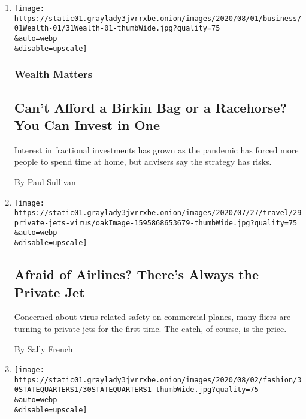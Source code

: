 \begin{enumerate}
\def\labelenumi{\arabic{enumi}.}
\item
  \href{/2020/07/31/your-money/birkin-bag-racehorse-invest.html}{}

  \texttt{[image: https://static01.graylady3jvrrxbe.onion/images/2020/08/01/business/01Wealth-01/31Wealth-01-thumbWide.jpg?quality=75\\\&auto=webp\\\&disable=upscale]}

  \hypertarget{wealth-matters}{%
  \subsubsection{Wealth Matters}\label{wealth-matters}}

  \hypertarget{cant-afford-a-birkin-bag-or-a-racehorse-you-can-invest-in-one}{%
  \subsection{Can't Afford a Birkin Bag or a Racehorse? You Can Invest
  in
  One}\label{cant-afford-a-birkin-bag-or-a-racehorse-you-can-invest-in-one}}

  Interest in fractional investments has grown as the pandemic has
  forced more people to spend time at home, but advisers say the
  strategy has risks.

  By Paul Sullivan
\item
  \href{/2020/07/30/travel/private-jets-coronavirus.html}{}

  \texttt{[image: https://static01.graylady3jvrrxbe.onion/images/2020/07/27/travel/29private-jets-virus/oakImage-1595868653679-thumbWide.jpg?quality=75\\\&auto=webp\\\&disable=upscale]}

  \hypertarget{afraid-of-airlines-theres-always-the-private-jet}{%
  \subsection{Afraid of Airlines? There's Always the Private
  Jet}\label{afraid-of-airlines-theres-always-the-private-jet}}

  Concerned about virus-related safety on commercial planes, many fliers
  are turning to private jets for the first time. The catch, of course,
  is the price.

  By Sally French
\item
  \href{/2020/07/30/style/state-quarters-coin-collectors-shortage-us-mint.html}{}

  \texttt{[image: https://static01.graylady3jvrrxbe.onion/images/2020/08/02/fashion/30STATEQUARTERS1/30STATEQUARTERS1-thumbWide.jpg?quality=75\\\&auto=webp\\\&disable=upscale]}


\end{enumerate}
